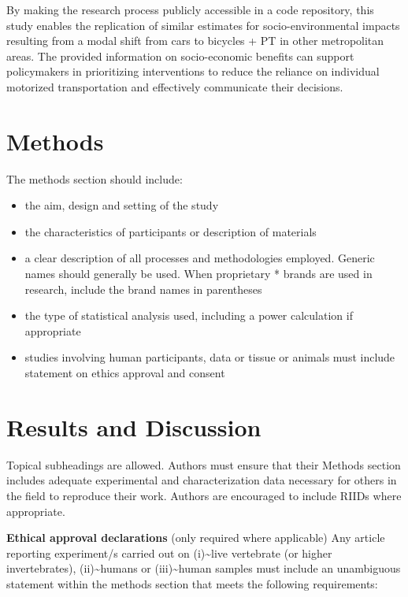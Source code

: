 \documentclass[sn-apa,referee,pdflatex]{sn-jnl}
\providecommand{\tightlist}{%
  \setlength{\itemsep}{0pt}\setlength{\parskip}{0pt}}
\begin{document}
By making the research process publicly accessible in a code repository,
this study enables the replication of similar estimates for
socio-environmental impacts resulting from a modal shift from cars to
bicycles + PT in other metropolitan areas. The provided information on
socio-economic benefits can support policymakers in prioritizing
interventions to reduce the reliance on individual motorized
transportation and effectively communicate their decisions.

\hypertarget{sec2}{%
\section{Methods}\label{sec2}}

The methods section should include:

\begin{itemize}
\tightlist
\item
  the aim, design and setting of the study
\item
  the characteristics of participants or description of materials
\item
  a clear description of all processes and methodologies employed.
  Generic names should generally be used. When proprietary * brands are
  used in research, include the brand names in parentheses
\item
  the type of statistical analysis used, including a power calculation
  if appropriate
\item
  studies involving human participants, data or tissue or animals must
  include statement on ethics approval and consent
\end{itemize}

\hypertarget{sec11}{%
\section{Results and Discussion}\label{sec11}}

Topical subheadings are allowed. Authors must ensure that their Methods
section includes adequate experimental and characterization data
necessary for others in the field to reproduce their work. Authors are
encouraged to include RIIDs where appropriate.

\textbf{Ethical approval declarations} (only required where applicable)
Any article reporting experiment/s carried out on
(i)\textasciitilde live vertebrate (or higher invertebrates),
(ii)\textasciitilde humans or (iii)\textasciitilde human samples must
include an unambiguous statement within the methods section that meets
the following requirements:
\end{document}
